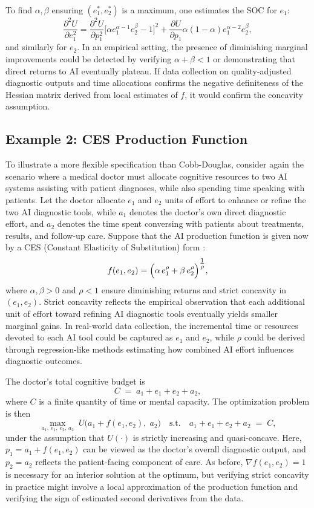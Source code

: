 \documentclass[11pt]{article}
\theoremstyle{definition}
\theoremstyle{remark}
\begin{document}
To find $\alpha,\beta$ ensuring $(e^*_1,e^*_2)$ is a maximum, one estimates the SOC for $e_1$:
\[
\frac{\partial^2 U}{\partial e_1^2}
=\frac{\partial^2 U}{\partial p_1^2}\bigl[\alpha e_1^{\alpha-1}e_2^{\beta}-1\bigr]^2
+\frac{\partial U}{\partial p_1}\alpha(1-\alpha)e_1^{\alpha-2}e_2^\beta,
\]
and similarly for $e_2$. In an empirical setting, the presence of diminishing marginal improvements could be detected by verifying $\alpha+\beta<1$ or demonstrating that direct returns to AI eventually plateau. If data collection on quality-adjusted diagnostic outputs and time allocations confirms the negative definiteness of the Hessian matrix derived from local estimates of $f$, it would confirm the concavity assumption.

\subsection{Example 2: CES Production Function}
To illustrate a more flexible specification than Cobb-Douglas, consider again the scenario where a medical doctor must allocate cognitive resources to two AI systems assisting with patient diagnoses, while also spending time speaking with patients. Let the doctor allocate $e_1$ and $e_2$ units of effort to enhance or refine the two AI diagnostic tools, while $a_1$ denotes the doctor’s own direct diagnostic effort, and $a_2$ denotes the time spent conversing with patients about treatments, results, and follow-up care. Suppose that the AI production function is given now by a CES (Constant Elasticity of Substitution) form \citep{arrow1961capital}:
\[
f(e_1, e_2)
=
\Bigl(\alpha\,e_1^\rho + \beta\,e_2^\rho\Bigr)^{\tfrac{1}{\rho}},
\]
where $\alpha, \beta > 0$ and $\rho < 1$ ensure diminishing returns and strict concavity in $(e_1,e_2)$. Strict concavity reflects the empirical observation that each additional unit of effort toward refining AI diagnostic tools eventually yields smaller marginal gains. In real-world data collection, the incremental time or resources devoted to each AI tool could be captured as $e_1$ and $e_2$, while $\rho$ could be derived through regression-like methods estimating how combined AI effort influences diagnostic outcomes.

The doctor’s total cognitive budget is
\[
C \;=\; a_1 + e_1 + e_2 + a_2,
\]
where $C$ is a finite quantity of time or mental capacity. The optimization problem is then
\[
\max_{a_1,\, e_1,\, e_2,\, a_2}
\; U\bigl(a_1 + f(e_1, e_2),\; a_2\bigr)
\quad
\text{s.t.}
\quad
a_1 + e_1 + e_2 + a_2 \;=\; C,
\]
under the assumption that $U(\cdot)$ is strictly increasing and quasi-concave. Here, $p_1 = a_1 + f(e_1, e_2)$ can be viewed as the doctor’s overall diagnostic output, and $p_2 = a_2$ reflects the patient-facing component of care. As before, $\nabla f(e_1, e_2)=1$ is necessary for an interior solution at the optimum, but verifying strict concavity in practice might involve a local approximation of the production function and verifying the sign of estimated second derivatives from the data.
\end{document}
